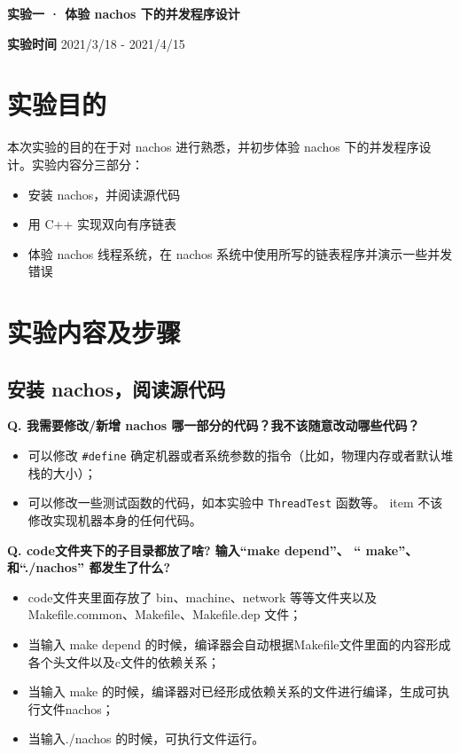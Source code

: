 \documentclass[a4paper,12pt]{article}
\begin{document}
\setcounter{page}{1}
\begin{center}
    \par \Large \textbf{实验一 · 体验 nachos 下的并发程序设计}
    \vspace{1em}
\end{center}

\normalsize
\par \textbf{实验时间} 2021/3/18 - 2021/4/15
\vspace{0.5em}

\section{实验目的}
\par 本次实验的目的在于对 nachos 进行熟悉，并初步体验 nachos 下的并发程序设计。实验内容分三部分：
\begin{itemize}
    \item 安装 nachos，并阅读源代码
    \item 用 C++ 实现双向有序链表
    \item 体验 nachos 线程系统，在 nachos 系统中使用所写的链表程序并演示一些并发错误
\end{itemize}

\section{实验内容及步骤}
\subsection{安装 nachos，阅读源代码}
\par\textbf{Q. 我需要修改/新增 nachos 哪一部分的代码？我不该随意改动哪些代码？}
\begin{itemize}
    \item 可以修改 \texttt{#define} 确定机器或者系统参数的指令（比如，物理内存或者默认堆栈的大小）；
    \item 可以修改一些测试函数的代码，如本实验中 \texttt{ThreadTest} 函数等。
    item 不该修改实现机器本身的任何代码。
\end{itemize}

\par\textbf{Q. code文件夹下的子目录都放了啥? 输入“make depend”、 “ make”、和“./nachos” 都发生了什么? }
\begin{itemize}
    \item code文件夹里面存放了 bin、machine、network 等等文件夹以及 Makefile.common、Makefile、Makefile.dep 文件；
    \item 当输入 make depend 的时候，编译器会自动根据Makefile文件里面的内容形成各个头文件以及c文件的依赖关系；
    \item 当输入 make 的时候，编译器对已经形成依赖关系的文件进行编译，生成可执行文件nachos；
    \item 当输入./nachos 的时候，可执行文件运行。
\end{itemize}
\end{document}
